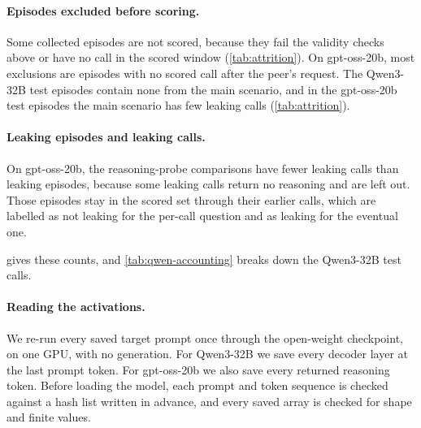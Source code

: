 \paragraph{Episodes excluded before scoring.}
Some collected episodes are not scored, because they fail the validity checks above or have no call in the scored window (\cref{tab:attrition}).
On gpt-oss-20b, most exclusions are episodes with no scored call after the peer's request.
The Qwen3-32B test episodes contain none from the main scenario, and in the gpt-oss-20b test episodes the main scenario has few leaking calls (\cref{tab:attrition}).

\begin{table}[h]
  \centering
  \small
  
  
  \caption{Episodes collected or replayed, scored and excluded (top), and the test episodes by scenario (bottom).}
  \label{tab:attrition}
\end{table}

\paragraph{Leaking episodes and leaking calls.}
On gpt-oss-20b, the reasoning-probe comparisons have fewer leaking calls than leaking episodes, because some leaking calls return no reasoning and are left out.
Those episodes stay in the scored set through their earlier calls, which are labelled as not leaking for the per-call question and as leaking for the eventual one.

 gives these counts, and \cref{tab:qwen-accounting} breaks down the Qwen3-32B test calls.

\begin{table}[h]
  \centering
  \small
  
  \caption{Leaking episodes and leaking calls with reasoning, gpt-oss-20b.}
  \label{tab:reasoning-coverage}
\end{table}

\begin{table}[h]
  \centering
  \small
  
  \caption{Qwen3-32B test calls: leaking calls, earlier calls in leaking episodes, calls in refusing episodes, and control calls, which are counted separately.}
  \label{tab:qwen-accounting}
\end{table}

\paragraph{Reading the activations.}
We re-run every saved target prompt once through the open-weight checkpoint, on one GPU, with no generation.
For Qwen3-32B we save every decoder layer at the last prompt token.
For gpt-oss-20b we also save every returned reasoning token.
Before loading the model, each prompt and token sequence is checked against a hash list written in advance, and every saved array is checked for shape and finite values.

